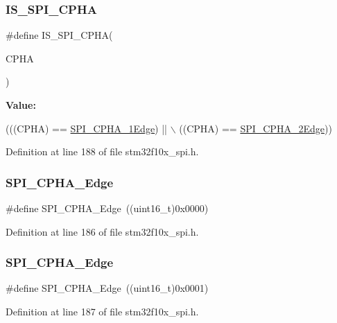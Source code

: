 \subsubsection{\texorpdfstring{I\+S\+\_\+\+S\+P\+I\+\_\+\+C\+P\+HA}{IS\_SPI\_CPHA}}
{\footnotesize\ttfamily \#define I\+S\+\_\+\+S\+P\+I\+\_\+\+C\+P\+HA(\begin{DoxyParamCaption}\item[{}]{C\+P\+HA }\end{DoxyParamCaption})}

{\bfseries Value\+:}
\begin{DoxyCode}
(((CPHA) == \hyperlink{group___s_p_i___clock___phase_gaade9d9555fac8a302bde5c94da9c7292}{SPI\_CPHA\_1Edge}) || \(\backslash\)
                           ((CPHA) == \hyperlink{group___s_p_i___clock___phase_ga7543f88bf05a08705eb4203862dcebdf}{SPI\_CPHA\_2Edge}))
\end{DoxyCode}


Definition at line 188 of file stm32f10x\+\_\+spi.\+h.

\mbox{\label{group___s_p_i___clock___phase_gaade9d9555fac8a302bde5c94da9c7292}} 
\subsubsection{\texorpdfstring{S\+P\+I\+\_\+\+C\+P\+H\+A\+\_\+Edge}{SPI\_CPHA\_1Edge}}
{\footnotesize\ttfamily \#define S\+P\+I\+\_\+\+C\+P\+H\+A\+\_\+Edge~((uint16\+\_\+t)0x0000)}



Definition at line 186 of file stm32f10x\+\_\+spi.\+h.

\mbox{\label{group___s_p_i___clock___phase_ga7543f88bf05a08705eb4203862dcebdf}} 
\subsubsection{\texorpdfstring{S\+P\+I\+\_\+\+C\+P\+H\+A\+\_\+Edge}{SPI\_CPHA\_2Edge}}
{\footnotesize\ttfamily \#define S\+P\+I\+\_\+\+C\+P\+H\+A\+\_\+Edge~((uint16\+\_\+t)0x0001)}



Definition at line 187 of file stm32f10x\+\_\+spi.\+h.

